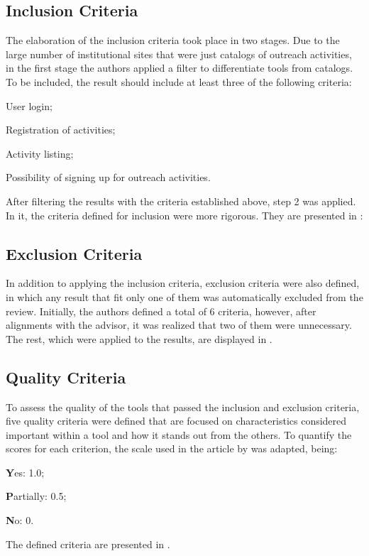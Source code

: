 \subsection{Inclusion Criteria}\label{sec:gl-planning-inc}

The elaboration of the inclusion criteria took place in two stages. Due to the large number of institutional sites that were just catalogs of outreach activities, in the first stage the authors applied a filter to differentiate tools from catalogs. To be included, the result should include at least three of the following criteria:
\begin{inparaenum}[(a)]
  \item User login;
  \item Registration of activities;
  \item Activity listing;
  \item Possibility of signing up for outreach activities.
\end{inparaenum}

After filtering the results with the criteria established above, step 2 was applied. In it, the criteria defined for inclusion were more rigorous. They are presented in :



\subsection{Exclusion Criteria}\label{sec:gl-planning-exc}

In addition to applying the inclusion criteria, exclusion criteria were also defined, in which any result that fit only one of them was automatically excluded from the review. Initially, the authors defined a total of 6 criteria, however, after alignments with the advisor, it was realized that two of them were unnecessary. The rest, which were applied to the results, are displayed in .



\subsection{Quality Criteria}\label{sec:gl-planning-qlty}

To assess the quality of the tools that passed the inclusion and exclusion criteria, five quality criteria were defined that are focused on characteristics considered important within a tool and how it stands out from the others. To quantify the scores for each criterion, the scale used in the article by  was adapted, being:
\begin{inparaenum}[(i)]
  \item \textbf{Y}es: 1.0;
  \item \textbf{P}artially: 0.5;
  \item \textbf{N}o: 0.
\end{inparaenum}
The defined criteria are presented in .

